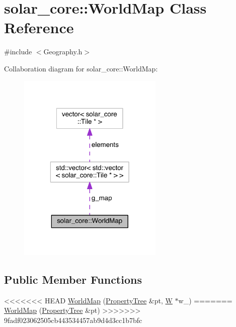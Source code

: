 \hypertarget{classsolar__core_1_1_world_map}{}\section{solar\+\_\+core\+:\+:World\+Map Class Reference}
\label{classsolar__core_1_1_world_map}


{\ttfamily \#include $<$Geography.\+h$>$}



Collaboration diagram for solar\+\_\+core\+:\+:World\+Map\+:\nopagebreak
\begin{figure}[H]
\begin{center}
\leavevmode
\includegraphics[width=196pt]{classsolar__core_1_1_world_map__coll__graph}
\end{center}
\end{figure}
\subsection*{Public Member Functions}
\begin{DoxyCompactItemize}
\item 
<<<<<<< HEAD
\hyperlink{classsolar__core_1_1_world_map_a9e3b75ab78e2754c06a777c1cf55c43a}{World\+Map} (\hyperlink{namespacesolar__core_adeda2737d6938c190eb774a5b2495045}{Property\+Tree} \&pt, \hyperlink{classsolar__core_1_1_w}{W} $\ast$w\+\_\+)
=======
\hyperlink{classsolar__core_1_1_world_map_adb4ade0405f6de1affb3f413496b4dd6}{World\+Map} (\hyperlink{namespacesolar__core_adeda2737d6938c190eb774a5b2495045}{Property\+Tree} \&pt)
>>>>>>> 9fadf023062505cb443534457ab9d4d3cc1b7bfc
\end{DoxyCompactItemize}
